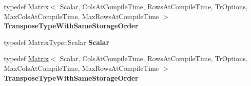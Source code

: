 \begin{DoxyCompactItemize}
typedef \hyperlink{group___core___module_class_eigen_1_1_matrix}{Matrix}$<$ Scalar, Cols\+At\+Compile\+Time, Rows\+At\+Compile\+Time, Tr\+Options, Max\+Cols\+At\+Compile\+Time, Max\+Rows\+At\+Compile\+Time $>$ {\bfseries Transpose\+Type\+With\+Same\+Storage\+Order}
\item 
\mbox{\label{class_eigen_1_1internal_1_1qr__preconditioner__impl_3_01_matrix_type_00_01_full_piv_householder_0bfd000ff4c8127883e77da4144b4435_ab4614d310274ec672b10bf51fee7caf5}} 
typedef Matrix\+Type\+::\+Scalar {\bfseries Scalar}
\item 
\mbox{\label{class_eigen_1_1internal_1_1qr__preconditioner__impl_3_01_matrix_type_00_01_full_piv_householder_0bfd000ff4c8127883e77da4144b4435_a1b7fe65d1a64c063e03f968ac201fc1a}} 
typedef \hyperlink{group___core___module_class_eigen_1_1_matrix}{Matrix}$<$ Scalar, Cols\+At\+Compile\+Time, Rows\+At\+Compile\+Time, Tr\+Options, Max\+Cols\+At\+Compile\+Time, Max\+Rows\+At\+Compile\+Time $>$ {\bfseries Transpose\+Type\+With\+Same\+Storage\+Order}
\end{DoxyCompactItemize}
